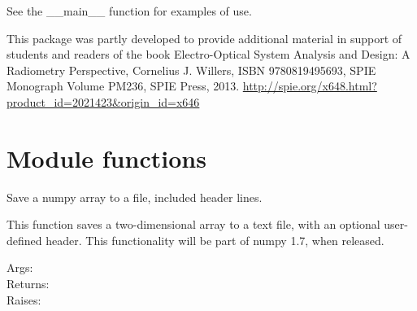 \documentclass[a4paper,10pt,english]{sphinxmanual}
\begin{document}
See the \_\_main\_\_ function for examples of use.

This package was partly developed to provide additional material in support of students 
and readers of the book Electro-Optical System Analysis and Design: A Radiometry 
Perspective,  Cornelius J. Willers, ISBN 9780819495693, SPIE Monograph Volume
PM236, SPIE Press, 2013.  \href{http://spie.org/x648.html?product\_id=2021423\&origin\_id=x646}{http://spie.org/x648.html?product\_id=2021423\&origin\_id=x646}


\section{Module functions}
\label{ryfiles:module-functions}

\begin{fulllineitems}
\label{ryfiles:pyradi.ryfiles.saveHeaderArrayTextFile}
Save a numpy array to a file, included header lines.

This function saves a two-dimensional array to a text file, with
an optional user-defined header. This functionality will be part of
numpy 1.7, when released.
\begin{description}
\item[{Args:}] \leavevmode
{}

\item[{Returns:}] \leavevmode
{}

\item[{Raises:}] \leavevmode
{}

\end{description}

\end{fulllineitems}
\end{document}
